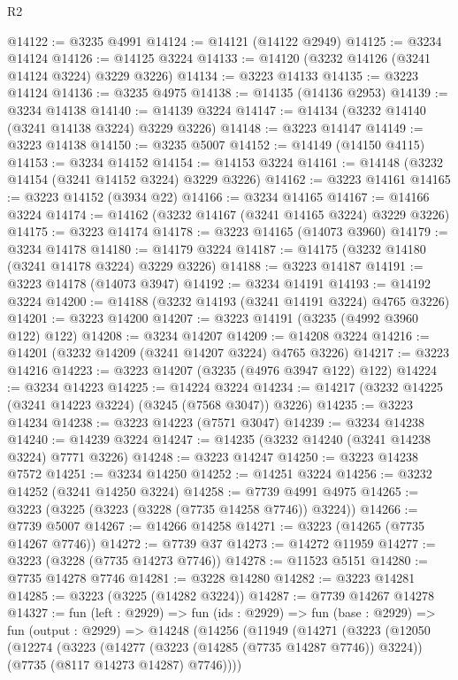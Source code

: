 \begin{lexlean}{R2}
\begin{coremodule}
@14122 := @3235 @4991
@14124 := @14121 (@14122 @2949)
@14125 := @3234 @14124
@14126 := @14125 @3224
@14133 := @14120 (@3232 @14126 (@3241 @14124 @3224) @3229 @3226)
@14134 := @3223 @14133
@14135 := @3223 @14124
@14136 := @3235 @4975
@14138 := @14135 (@14136 @2953)
@14139 := @3234 @14138
@14140 := @14139 @3224
@14147 := @14134 (@3232 @14140 (@3241 @14138 @3224) @3229 @3226)
@14148 := @3223 @14147
@14149 := @3223 @14138
@14150 := @3235 @5007
@14152 := @14149 (@14150 @4115)
@14153 := @3234 @14152
@14154 := @14153 @3224
@14161 := @14148 (@3232 @14154 (@3241 @14152 @3224) @3229 @3226)
@14162 := @3223 @14161
@14165 := @3223 @14152 (@3934 @22)
@14166 := @3234 @14165
@14167 := @14166 @3224
@14174 := @14162 (@3232 @14167 (@3241 @14165 @3224) @3229 @3226)
@14175 := @3223 @14174
@14178 := @3223 @14165 (@14073 @3960)
@14179 := @3234 @14178
@14180 := @14179 @3224
@14187 := @14175 (@3232 @14180 (@3241 @14178 @3224) @3229 @3226)
@14188 := @3223 @14187
@14191 := @3223 @14178 (@14073 @3947)
@14192 := @3234 @14191
@14193 := @14192 @3224
@14200 := @14188 (@3232 @14193 (@3241 @14191 @3224) @4765 @3226)
@14201 := @3223 @14200
@14207 := @3223 @14191 (@3235 (@4992 @3960 @122) @122)
@14208 := @3234 @14207
@14209 := @14208 @3224
@14216 := @14201 (@3232 @14209 (@3241 @14207 @3224) @4765 @3226)
@14217 := @3223 @14216
@14223 := @3223 @14207 (@3235 (@4976 @3947 @122) @122)
@14224 := @3234 @14223
@14225 := @14224 @3224
@14234 := @14217 (@3232 @14225 (@3241 @14223 @3224) (@3245 (@7568 @3047)) @3226)
@14235 := @3223 @14234
@14238 := @3223 @14223 (@7571 @3047)
@14239 := @3234 @14238
@14240 := @14239 @3224
@14247 := @14235 (@3232 @14240 (@3241 @14238 @3224) @7771 @3226)
@14248 := @3223 @14247
@14250 := @3223 @14238 @7572
@14251 := @3234 @14250
@14252 := @14251 @3224
@14256 := @3232 @14252 (@3241 @14250 @3224)
@14258 := @7739 @4991 @4975
@14265 := @3223 (@3225 (@3223 (@3228 (@7735 @14258 @7746)) @3224))
@14266 := @7739 @5007
@14267 := @14266 @14258
@14271 := @3223 (@14265 (@7735 @14267 @7746))
@14272 := @7739 @37
@14273 := @14272 @11959
@14277 := @3223 (@3228 (@7735 @14273 @7746))
@14278 := @11523 @5151
@14280 := @7735 @14278 @7746
@14281 := @3228 @14280
@14282 := @3223 @14281
@14285 := @3223 (@3225 (@14282 @3224))
@14287 := @7739 @14267 @14278
@14327 := fun (left : @2929) =>
  fun (ids : @2929) =>
  fun (base : @2929) =>
  fun (output : @2929) =>
  @14248
    (@14256
      (@11949
        (@14271
          (@3223
            (@12050
              (@12274
                (@3223
                  (@14277 (@3223 (@14285 (@7735 @14287 @7746)) @3224))
                  (@7735 (@8117 @14273 @14287) @7746))))

\end{coremodule}
\end{lexlean}
